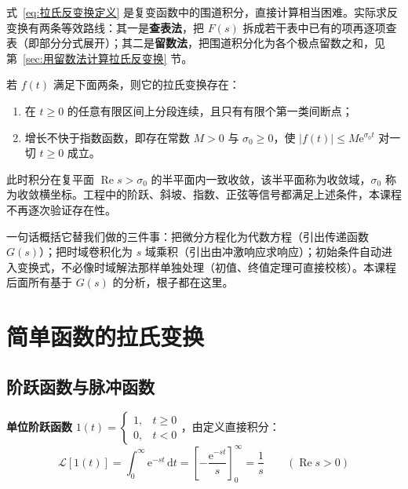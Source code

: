 \begin{remark}
式~\eqref{eq:拉氏反变换定义} 是复变函数中的围道积分，直接计算相当困难。实际求反变换有两条等效路线：其一是\textbf{查表法}，把 $F(s)$ 拆成若干表中已有的项再逐项查表（即部分分式展开）；其二是\textbf{留数法}，把围道积分化为各个极点留数之和，见第~\ref{sec:用留数法计算拉氏反变换} 节。
\end{remark}

\begin{keybox}[变换存在的条件]
若 $f(t)$ 满足下面两条，则它的拉氏变换存在：
\begin{enumerate}
\item 在 $t\ge 0$ 的任意有限区间上分段连续，且只有有限个第一类间断点；
\item 增长不快于指数函数，即存在常数 $M>0$ 与 $\sigma_0\ge 0$，使 $\left|f(t)\right|\le M\mathrm{e}^{\sigma_0 t}$ 对一切 $t\ge 0$ 成立。
\end{enumerate}
此时积分在复平面 $\operatorname{Re}s>\sigma_0$ 的半平面内一致收敛，该半平面称为收敛域，$\sigma_0$ 称为收敛横坐标。工程中的阶跃、斜坡、指数、正弦等信号都满足上述条件，本课程不再逐次验证存在性。
\end{keybox}

\begin{tipbox}[为什么要用拉氏变换]
一句话概括它替我们做的三件事：把微分方程化为代数方程（引出传递函数 $G(s)$）；把时域卷积化为 $s$ 域乘积（引出由冲激响应求响应）；初始条件自动进入变换式，不必像时域解法那样单独处理（初值、终值定理可直接校核）。本课程后面所有基于 $G(s)$ 的分析，根子都在这里。
\end{tipbox}

\section{简单函数的拉氏变换}
\label{sec:简单函数的拉氏变换}

\subsection{阶跃函数与脉冲函数}

\textbf{单位阶跃函数} $1(t)=\begin{cases}1, & t\ge 0\\ 0, & t<0\end{cases}$，由定义直接积分：
\begin{equation}
\mathcal{L}\left[1(t)\right]=\int_{0}^{\infty}\mathrm{e}^{-st}\,\mathrm{d}t=\left[-\frac{\mathrm{e}^{-st}}{s}\right]_{0}^{\infty}=\frac{1}{s}
\qquad(\operatorname{Re}s>0)
\label{eq:阶跃变换}
\end{equation}

